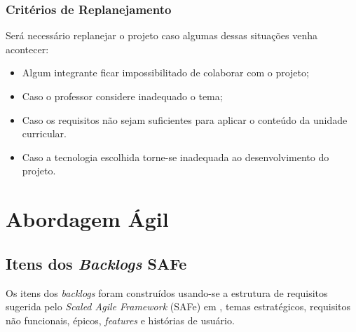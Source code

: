 \documentclass[
	12pt,				%
	oneside,			%
	a4paper,			%
	english,			%
	brazil,				%
	]{abntex2}
\begin{document}


\section{Critérios de Replanejamento}
Será necessário replanejar o projeto caso algumas dessas situações venha acontecer:
\begin{itemize}
    \item Algum integrante ficar impossibilitado de colaborar com o projeto;
    \item Caso o professor considere inadequado o tema;
    \item Caso os requisitos não sejam suficientes para aplicar o conteúdo da unidade curricular.
    \item Caso a tecnologia escolhida torne-se inadequada ao desenvolvimento do projeto.
\end{itemize}

\part{Abordagem Ágil}

\chapter{Itens dos \textit{Backlogs} SAFe}
Os itens dos \textit{backlogs} foram construídos usando-se a estrutura de requisitos sugerida pelo \foreignlanguage{english}{\textit{Scaled Agile Framework}} (SAFe) em \cite{safe_requirements_model}, temas estratégicos, requisitos não funcionais, épicos, \textit{features} e histórias de usuário.
\end{document}
